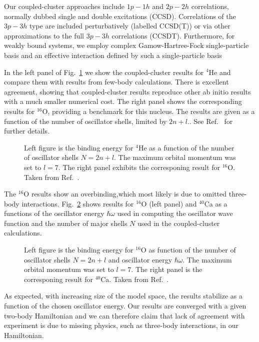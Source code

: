 \documentclass{ws-procs975x65}
\begin{document}
Our coupled-cluster approaches include $1p-1h$ and $2p-2h$ correlations, normally dubbed 
single and double excitations (CCSD). Correlations of the $3p-3h$ type are included perturbatively
(labelled CCSD(T)) or via other approximations to the full $3p-3h$ correlations (CCSDT). 
Furthermore, for weakly bound systems, we 
employ  complex Gamow-Hartree-Fock single-particle basis and an effective 
interaction  defined by such a single-particle basis \cite{hagen1,hagen2}

In the left panel of Fig.~\ref{fig:he4} we show the 
coupled-cluster results 
for $^4$He and compare them with results from
few-body calculations. There is excellent agreement, 
showing that coupled-cluster results reproduce other
ab initio results with a much smaller numerical cost.  
The right panel shows the corresponding results for
$^{16}$O, providing a benchmark for this nucleus. The results are given as a 
function of the number of oscillator
shells, limited by $2n+l$.\cite{hagen2}. See Ref.~\cite{hagen2} for further details.
\begin{figure}[b]%
\begin{center}
  \parbox{2.1in}{}
  \hspace*{4pt}
  \parbox{2.1in}{}
  \caption{Left figure is the binding energy for $^4$He as a function of the number of oscillator shells $N=2n+l$.
The maximum orbital momentum was set to $l=7$. 
The right panel exhibits the corresponing result for $^{16}$O.  Taken from Ref.~\cite{hagen2}.}%
  \label{fig:he4}
\end{center}
\end{figure}
The $^{16}$O results show an overbinding,which most likely is due to omitted three-body interactions.
Fig.~\ref{fig:ox16} shows results for $^{16}$O (left panel) and $^{40}$Ca as a functions of the oscillator
energy $\hbar\omega$ used in computing the oscillator wave 
function and the number of major shells $N$
used in the coupled-cluster calculations. 
\begin{figure}[b]%
\begin{center}
  \parbox{2.1in}{}
  \hspace*{4pt}
  \parbox{2.1in}{}
  \caption{Left figure is the binding energy for $^{16}$O as function of the number of oscillator shells $N=2n+l$ and oscillator energy $\hbar\omega$. The maximum orbital momentum was set to $l=7$. 
The right panel is the corresponing result for $^{40}$Ca. Taken from Ref.~\cite{hagen2}.}%
  \label{fig:ox16}
\end{center}
\end{figure}
As expected, with increasing size 
of the model space, the results stabilize as a function of the 
chosen oscillator energy.  Our results are converged with a given two-body Hamiltonian and we can therefore claim
that lack of agreement with experiment is due to missing physics, such as three-body interactions, in our Hamiltonian.
\end{document}
